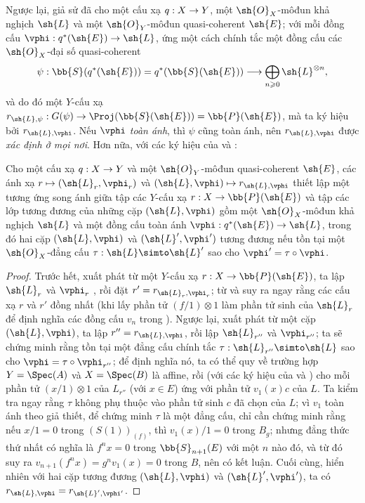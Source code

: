 \documentclass[oneside,10pt]{amsart}
\makeatletter
\renewcommand{\geq}{\geqslant}
\newcommand{\ega@arrow}[2]{\mathchoice{#1}{#2}{#2}{#2}}
\let\ega@shortmapsto\mapsto
\renewcommand{\to}{\ega@arrow{\longrightarrow}{\rightarrow}}
\renewcommand{\mapsto}{\ega@arrow{\longmapsto}{\ega@shortmapsto}}
\newcommand{\oldpage}[2][]{\marginnote{\normalfont\footnotesize\textbf{#1}~|~#2}\ignorespaces}
\let\EGAOriginalLabel\label
\renewcommand{\label}[1]{\phantomsection\EGAOriginalLabel{#1}}
\makeatother
\begin{document}
\begin{env}[4.2.2]
\label{II.4.2.2}
Ngược lại, giả sử đã cho một cấu xạ $q:X\to Y$, một $\sh{O}_X$-môđun khả nghịch $\sh{L}$ và một $\sh{O}_Y$-môđun quasi-coherent $\sh{E}$;
với mỗi đồng cấu $\vphi:q^*(\sh{E})\to\sh{L}$, ứng một cách chính tắc một đồng cấu các $\sh{O}_X$-đại số quasi-coherent
\[
  \psi: \bb{S}(q^*(\sh{E})) = q^*(\bb{S}(\sh{E})) \to \bigoplus_{n\geq0}\sh{L}^{\otimes n},
\]
và do đó  một $Y$-cấu xạ $r_{\sh{L},\psi}:G(\psi)\to\Proj(\bb{S}(\sh{E}))=\bb{P}(\sh{E})$, mà ta ký hiệu bởi $r_{\sh{L},\vphi}$.
Nếu $\vphi$ \emph{toàn ánh}, thì $\psi$ cũng toàn ánh, nên  $r_{\sh{L},\vphi}$ được \emph{xác định ở mọi nơi}.
Hơn nữa, với các ký hiệu của  và :
\end{env}

\begin{proposition}[4.2.3]
\label{II.4.2.3}
Cho một cấu xạ $q:X\to Y$ và một $\sh{O}_Y$-môđun quasi-coherent $\sh{E}$, các ánh xạ $r\mapsto(\sh{L}_r,\vphi_r)$ và $(\sh{L},\vphi)\mapsto r_{\sh{L},\vphi}$ thiết lập một tương ứng song ánh giữa tập các $Y$-cấu xạ $r:X\to\bb{P}(\sh{E})$ và tập các lớp tương đương của những cặp $(\sh{L},\vphi)$ gồm một $\sh{O}_X$-môđun khả nghịch $\sh{L}$ và một đồng cấu toàn ánh $\vphi:q^*(\sh{E})\to\sh{L}$, trong đó hai cặp $(\sh{L},\vphi)$ và $(\sh{L}',\vphi')$ tương đương nếu tồn tại một $\sh{O}_X$-đẳng cấu $\tau:\sh{L}\simto\sh{L}'$ sao cho $\vphi'=\tau\circ\vphi$.
\end{proposition}

\begin{proof}
Trước hết, xuất phát từ một $Y$-cấu xạ $r:X\to\bb{P}(\sh{E})$, ta lập $\sh{L}_r$ và $\vphi_r$ , rồi đặt $r'=r_{\sh{L}_r,\vphi_r}$;
từ  và  suy ra ngay rằng các cấu xạ $r$ và $r'$ đồng nhất (khi lấy phần tử $(f/1)\otimes1$ làm phần tử sinh của $\sh{L}_r$ để định nghĩa các đồng cấu $v_n$ trong ).
Ngược lại, xuất phát từ một cặp $(\sh{L},\vphi)$, ta lập
\oldpage[II]{74}
$r''=r_{\sh{L},\vphi}$, rồi lập $\sh{L}_{r''}$ và $\vphi_{r''}$;
ta sẽ chứng minh rằng tồn tại một đẳng cấu chính tắc $\tau:\sh{L}_{r''}\simto\sh{L}$ sao cho $\vphi=\tau\circ\vphi_{r''}$;
để định nghĩa nó, ta có thể quy về trường hợp $Y=\Spec(A)$ và $X=\Spec(B)$ là affine, rồi (với các ký hiệu của  và ) cho mỗi phần tử $(x/1)\otimes1$ của $L_{r''}$ (với $x\in E$) ứng với phần tử $v_1(x)c$ của $L$.
Ta kiểm tra ngay rằng $\tau$ không phụ thuộc vào phần tử sinh $c$ đã chọn của $L$;
vì $v_1$ toàn ánh theo giả thiết, để chứng minh $\tau$ là một đẳng cấu, chỉ cần chứng minh rằng nếu $x/1=0$ trong $(S(1))_{(f)}$, thì $v_1(x)/1=0$ trong $B_g$;
nhưng đẳng thức thứ nhất có nghĩa là $f^nx=0$ trong $\bb{S}_{n+1}(E)$ với một $n$ nào đó, và từ đó suy ra $v_{n+1}(f^nx)=g^nv_1(x)=0$ trong $B$, nên có kết luận.
Cuối cùng, hiển nhiên với hai cặp tương đương $(\sh{L},\vphi)$ và $(\sh{L}',\vphi')$, ta có $r_{\sh{L},\vphi}=r_{\sh{L}',\vphi'}$.
\end{proof}
\end{document}
